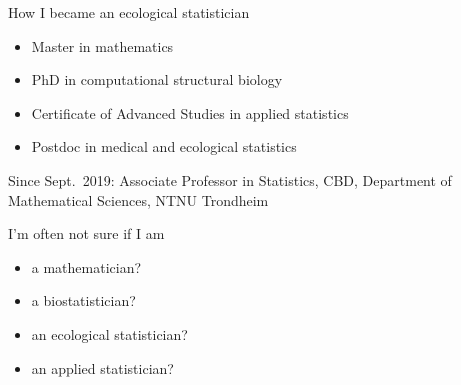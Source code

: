 \documentclass[10pt,ignorenonframetext,]{beamer}
\providecommand{\tightlist}{%
  \setlength{\itemsep}{0pt}\setlength{\parskip}{0pt}}
\begin{document}
\begin{frame}

\begin{block}{How I became an ecological statistician}

\vspace{3mm}

\begin{itemize}
\item
  Master in mathematics
\item
  PhD in computational structural biology
\item
  Certificate of Advanced Studies in applied statistics
\item
  Postdoc in medical and ecological statistics
\end{itemize}

\vspace{2mm}

Since Sept.~2019: Associate Professor in Statistics, CBD, Department of
Mathematical Sciences, NTNU Trondheim

\vspace{5mm}

I'm often not sure if I am

\vspace{2mm}

\begin{itemize}
\tightlist
\item
  a mathematician?
\item
  a biostatistician?\\
\item
  an ecological statistician?\\
\item
  an applied statistician?
\end{itemize}

\end{block}

\end{frame}
\end{document}
